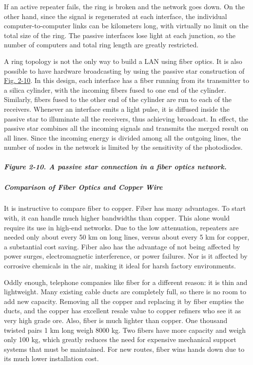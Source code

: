 If an active repeater fails, the ring is broken and the network goes
down. On the other hand, since the signal is regenerated at each
interface, the individual computer-to-computer links can be kilometers
long, with virtually no limit on the total size of the ring. The passive
interfaces lose light at each junction, so the number of computers and
total ring length are greatly restricted.

A ring topology is not the only way to build a LAN using fiber optics.
It is also possible to have hardware broadcasting by using the {passive
star} construction of
\protect\hyperlink{0130661023_ch02lev1sec2.htmlux5cux23ch02fig10}{Fig.
2-10}. In this design, each interface has a fiber running from its
transmitter to a silica cylinder, with the incoming fibers fused to one
end of the cylinder. Similarly, fibers fused to the other end of the
cylinder are run to each of the receivers. Whenever an interface emits a
light pulse, it is diffused inside the passive star to illuminate all
the receivers, thus achieving broadcast. In effect, the passive star
combines all the incoming signals and transmits the merged result on all
lines. Since the incoming energy is divided among all the outgoing
lines, the number of nodes in the network is limited by the sensitivity
of the photodiodes.

\subparagraph[Figure 2-10. A passive star connection in a fiber optics
network.]{\texorpdfstring{\protect\hypertarget{0130661023_ch02lev1sec2.htmlux5cux23ch02fig10}{}{}Figure
2-10. A passive star connection in a fiber optics
network.}{Figure 2-10. A passive star connection in a fiber optics network.}}


\protect\hypertarget{0130661023_ch02lev1sec2.htmlux5cux23ch02lev3sec4}{}{}

\subparagraph{Comparison of Fiber Optics and Copper Wire}

It is instructive to compare fiber to copper. Fiber has many advantages.
To start with, it can handle much higher bandwidths than copper. This
alone would require its use in high-end networks. Due to the low
attenuation, repeaters are needed only about every 50 km on long lines,
versus about every 5 km for copper, a substantial cost saving. Fiber
also has the advantage of not being affected by power surges,
electromagnetic interference, or power failures. Nor is it affected by
corrosive chemicals in the air, making it ideal for harsh factory
environments.

Oddly enough, telephone companies like fiber for a different reason: it
is thin and lightweight. Many existing cable ducts are completely full,
so there is no room to add new capacity. Removing all the copper and
replacing it by fiber empties the ducts, and the copper has excellent
resale value to copper refiners who see it as very high grade ore. Also,
fiber is much lighter than copper. One thousand twisted pairs 1 km long
weigh 8000 kg. Two fibers have more capacity and weigh only 100 kg,
which greatly reduces the need for expensive mechanical support systems
that must be maintained. For new routes, fiber wins hands down due to
its much lower installation cost.


